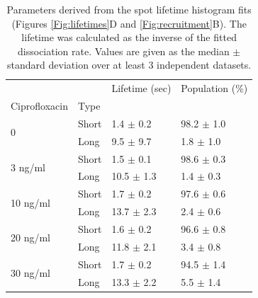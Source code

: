 \begin{table}[htbp]
    \centering
    \caption{Parameters derived from the spot lifetime histogram fits (Figures \ref{Fig:lifetimes}D and \ref{Fig:recruitment}B). The lifetime was calculated as the inverse of the fitted dissociation rate. Values are given as the median $\pm$ standard deviation over at least 3 independent datasets.}
    \begin{tabular}{llll}
        \toprule
         &  & Lifetime (sec) & Population (\%) \\
        Ciprofloxacin & Type &  &  \\
        \midrule
        \multirow[t]{2}{*}{0} & Short & 1.4 $\pm$ 0.2 & 98.2 $\pm$ 1.0 \\
         & Long & 9.5 $\pm$ 9.7 & 1.8 $\pm$ 1.0 \\
        \cline{1-4}
        \multirow[t]{2}{*}{3 ng/ml} & Short & 1.5 $\pm$ 0.1 & 98.6 $\pm$ 0.3 \\
         & Long & 10.5 $\pm$ 1.3 & 1.4 $\pm$ 0.3 \\
        \cline{1-4}
        \multirow[t]{2}{*}{10 ng/ml} & Short & 1.7 $\pm$ 0.2 & 97.6 $\pm$ 0.6 \\
         & Long & 13.7 $\pm$ 2.3 & 2.4 $\pm$ 0.6 \\
        \cline{1-4}
        \multirow[t]{2}{*}{20 ng/ml} & Short & 1.6 $\pm$ 0.2 & 96.6 $\pm$ 0.8 \\
         & Long & 11.8 $\pm$ 2.1 & 3.4 $\pm$ 0.8 \\
        \cline{1-4}
        \multirow[t]{2}{*}{30 ng/ml} & Short & 1.7 $\pm$ 0.2 & 94.5 $\pm$ 1.4 \\
         & Long & 13.3 $\pm$ 2.2 & 5.5 $\pm$ 1.4 \\
        \cline{1-4}
        \bottomrule
        \end{tabular}
    \label{tab:fit_results}
\end{table}

